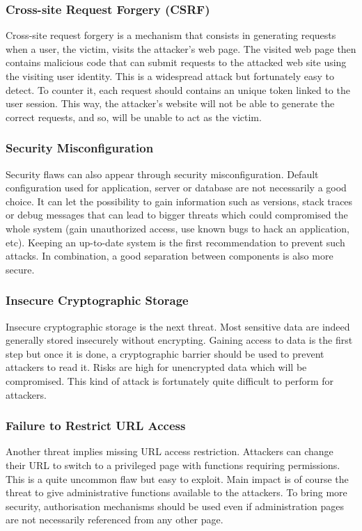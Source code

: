 \subsubsection{Cross-site Request Forgery (CSRF)}
Cross-site request forgery is a mechanism that consists in generating requests
when a user, the victim, visits the attacker's web page. The visited web page
then contains malicious code that can submit requests to the attacked web site
using the visiting user identity. This is a widespread attack but fortunately
easy to detect. To counter it, each request should contains an unique token
linked to the user session. This way, the attacker's website will not be able to
generate the correct requests, and so, will be unable to act as the victim.


\subsubsection{Security Misconfiguration}
Security flaws can also appear through security misconfiguration. Default
configuration used for application, server or database are not necessarily a
good choice. It can let the possibility to gain information such as versions,
stack traces or debug messages that can lead to bigger threats which could
compromised the whole system (gain unauthorized access, use known bugs to hack
an application, etc). Keeping an up-to-date system is the first recommendation
to prevent such attacks. In combination, a good separation between components is
also more secure.

\subsubsection{Insecure Cryptographic Storage}
Insecure cryptographic storage is the next threat. Most sensitive data are
indeed generally stored insecurely without encrypting. Gaining access to data is
the first step but once it is done, a cryptographic barrier should be used to
prevent attackers to read it. Risks are high for unencrypted data which will be
compromised. This kind of attack is fortunately quite difficult to perform for
attackers.

\subsubsection{Failure to Restrict URL Access}
Another threat implies missing URL access restriction. Attackers can change
their URL to switch to a privileged page with functions requiring permissions.
This is a quite uncommon flaw but easy to exploit. Main impact is of course the
threat to give administrative functions available to the attackers. To bring
more security, authorisation mechanisms should be used even if administration
pages are not necessarily referenced from any other page.

